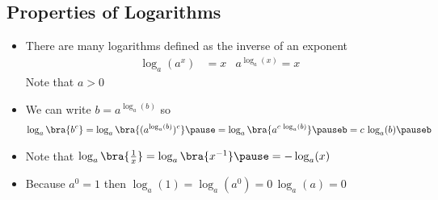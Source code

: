 


\begin{slide}
\section{Properties of Logarithms}

\begin{PauseHighLight}
  \begin{itemize}
  \item There are many logarithms defined as the inverse of an exponent
    \begin{align*}
      \log_a(a^x) &=x & a^{\log_a(x)}= x
    \end{align*}
    Note that $a>0$\pause
  \item We can write $b = a^{\log_a(b)}$ so
    \begin{align*}
      \log_a\bra{b^c} = \log_a\bra{(a^{\log_a(b)})^c}\pause =
      \log_a\bra{a^{c\,\log_a(b)}}\pauseb = c\,\log_a(b)\pauseb
    \end{align*}
  \item Note that $\log_a\bra{\frac{1}{x}}= \log_a\bra{x^{-1}}\pause = -\log_a(x)$\pauseb
  \item Because $a^0 =1$ then $\log_a(1)= \log_a(a^0) = 0\,\log_a(a)=
    0$\pause
  \end{itemize}
\end{PauseHighLight}

\end{slide}



